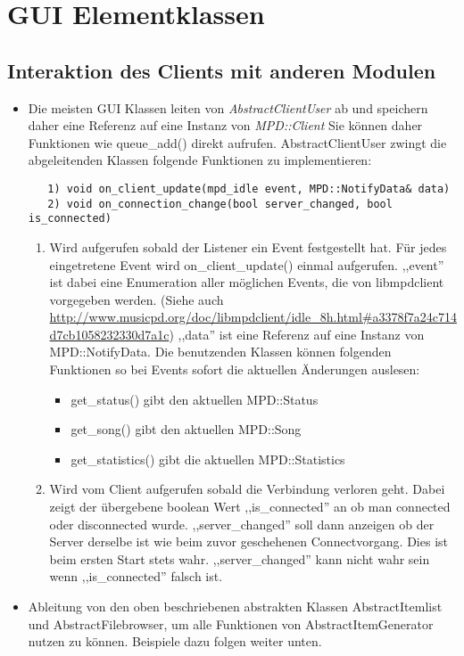 \section{GUI Elementklassen}
\subsection{Interaktion des Clients mit anderen Modulen}
\begin{itemize}
\item Die meisten GUI Klassen leiten von \emph{AbstractClientUser} ab und speichern daher eine Referenz auf eine Instanz von \emph{MPD::Client}
      Sie können daher Funktionen wie queue\_add() direkt aufrufen.
      AbstractClientUser zwingt die abgeleitenden Klassen folgende Funktionen zu implementieren: 
\begin{verbatim} 
   1) void on_client_update(mpd_idle event, MPD::NotifyData& data)
   2) void on_connection_change(bool server_changed, bool is_connected)
\end{verbatim}
   \begin{enumerate}
   \item Wird aufgerufen sobald der Listener ein Event festgestellt hat. Für jedes eingetretene Event wird on\_client\_update()    
   einmal aufgerufen. ,,event'' ist dabei eine Enumeration aller möglichen Events, die von libmpdclient 
   vorgegeben werden. (Siehe auch \url{http://www.musicpd.org/doc/libmpdclient/idle\_8h.html#a3378f7a24c714d7cb1058232330d7a1c})
   ,,data'' ist eine Referenz auf eine Instanz von MPD::NotifyData. Die benutzenden Klassen können folgenden Funktionen so
   bei Events sofort die aktuellen Änderungen auslesen:
   \begin{itemize} 
     \item get\_status() gibt den aktuellen MPD::Status
     \item get\_song() gibt den aktuellen MPD::Song
     \item get\_statistics() gibt die aktuellen MPD::Statistics
   \end{itemize} 
   \item Wird vom Client aufgerufen sobald die Verbindung verloren geht.
         Dabei zeigt der übergebene boolean Wert ,,is\_connected'' an ob man connected oder disconnected wurde.
         ,,server\_changed'' soll dann anzeigen ob der Server derselbe ist wie beim zuvor geschehenen Connectvorgang.
         Dies ist beim ersten Start stets wahr. ,,server\_changed'' kann nicht wahr sein wenn ,,is\_connected'' falsch ist.
   \end{enumerate}
\item Ableitung von den oben beschriebenen abstrakten Klassen AbstractItemlist und AbstractFilebrowser, um alle Funktionen von AbstractItemGenerator nutzen zu können. Beispiele dazu folgen weiter unten.
\end{itemize}


